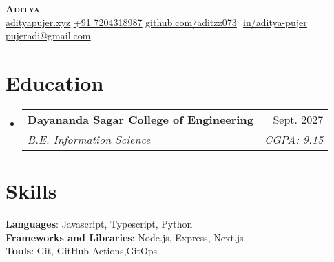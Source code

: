 \documentclass[letterpaper,11pt]{article}
\makeatletter
\newcommand{\resumeSubheading}[4]{
  \vspace{-2pt}\item
    \begin{tabular*}{0.97\textwidth}[t]{l@{\extracolsep{\fill}}r}
      \textbf{#1} & #2 \\
      \textit{\small#3} & \textit{\small #4} \\
    \end{tabular*}\vspace{-7pt}
}
\newcommand{\resumeSubHeadingListStart}{\begin{itemize}[leftmargin=0.15in, label={}]}
\newcommand{\resumeSubHeadingListEnd}{\end{itemize}}
\makeatother
\begin{document}
\begin{flushright}
  \color{gray}
  \item
\end{flushright}

\vspace{-16.5pt}

\begin{center}
    \textbf{\Huge \scshape Aditya} \\ \vspace{8pt}
    \small 
    \href{https://www.adityapujer.xyz}
    {\underline{adityapujer.xyz}}
    \href{tel:+917204328987}
    {\underline{+91 7204318987}}
    \href{https://github.com/aditzz073}{\underline{github.com/aditzz073}} $  $
    \href{https://linkedin.com/in/aditya-pujer}{\underline{in/aditya-pujer}} $  $
    \href{mailto:pujeradi@gmail.com}
    {\underline{pujeradi@gmail.com}}
    
\end{center}

\section{Education}
  \resumeSubHeadingListStart
  
    \resumeSubheading
      {Dayananda Sagar College of Engineering}{Sept. 2027}
      {B.E. Information Science}{CGPA: 9.15}
  \resumeSubHeadingListEnd
\section{Skills}
 \begin{itemize}[leftmargin=0.15in, label={}]
    \small{\item{
    
     \textbf{Languages}{: Javascript, Typescript, Python} \\
     \textbf{Frameworks and Libraries}{: Node.js, Express, Next.js} \\
     
     \textbf{Tools}{: Git, GitHub Actions,GitOps}     
     
    }}
 \end{itemize}
 \vspace{-15pt}
 
\end{document}
